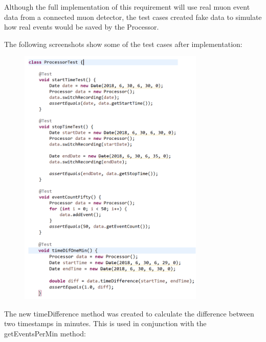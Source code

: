 \documentclass[11pt,a4paper]{article}
\begin{document}
Although the full implementation of this requirement will use real muon event data from a connected muon detector, the test cases created fake data to simulate how real events would be saved by the Processor.

The following screenshots show some of the test cases after implementation:



\begin{figure}[h]
	\includegraphics[width=0.79\textwidth]{codeimg4.png}
	\end{figure}

The new timeDifference method was created to calculate the difference between two timestamps in minutes. This is used in conjunction with the getEventsPerMin method:
\end{document}
